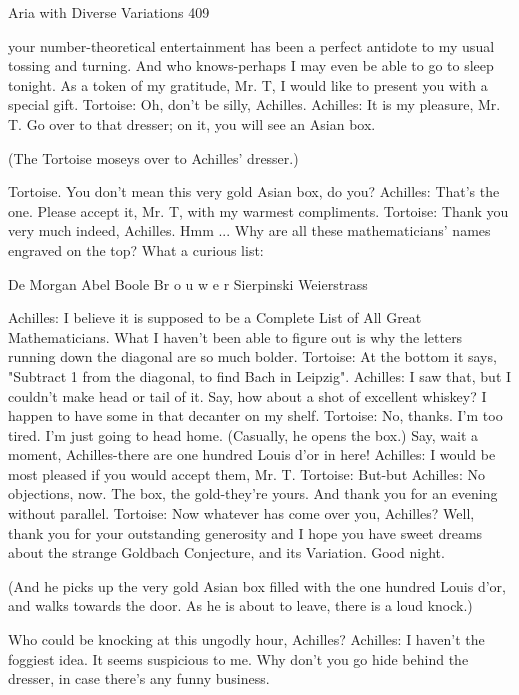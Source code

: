 Aria with Diverse Variations                                                             409

    your number-theoretical entertainment has been a perfect antidote to my usual
    tossing and turning. And who knows-perhaps I may even be able to go to sleep
    tonight. As a token of my gratitude, Mr. T, I would like to present you with a special
    gift.
Tortoise: Oh, don't be silly, Achilles.
Achilles: It is my pleasure, Mr. T. Go over to that dresser; on it, you will see an Asian
    box.

    (The Tortoise moseys over to Achilles' dresser.)

Tortoise. You don't mean this very gold Asian box, do you?
Achilles: That's the one. Please accept it, Mr. T, with my warmest compliments.
Tortoise: Thank you very much indeed, Achilles. Hmm ... Why are all these
    mathematicians' names engraved on the top? What a curious list:

                         De Morgan
                         Abel
                         Boole
                         Br o u w e r
                         Sierpinski
                         Weierstrass

Achilles: I believe it is supposed to be a Complete List of All Great Mathematicians.
    What I haven't been able to figure out is why the letters running down the diagonal
    are so much bolder.
Tortoise: At the bottom it says, "Subtract 1 from the diagonal, to find Bach in Leipzig".
Achilles: I saw that, but I couldn't make head or tail of it. Say, how about a shot of
    excellent whiskey? I happen to have some in that decanter on my shelf.
Tortoise: No, thanks. I'm too tired. I'm just going to head home. (Casually, he opens the
    box.) Say, wait a moment, Achilles-there are one hundred Louis d'or in here!
Achilles: I would be most pleased if you would accept them, Mr. T. Tortoise: But-but
Achilles: No objections, now. The box, the gold-they're yours. And thank you for an
    evening without parallel.
Tortoise: Now whatever has come over you, Achilles? Well, thank you for your
    outstanding generosity and I hope you have sweet dreams about the strange
    Goldbach Conjecture, and its Variation. Good night.

    (And he picks up the very gold Asian box filled with the one hundred Louis d'or, and
    walks towards the door. As he is about to leave, there is a loud knock.)

    Who could be knocking at this ungodly hour, Achilles?
Achilles: I haven't the foggiest idea. It seems suspicious to me. Why don't you go hide
    behind the dresser, in case there's any funny business.





